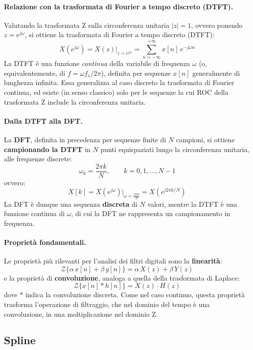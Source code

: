 \paragraph{Relazione con la trasformata di Fourier a tempo discreto (DTFT).}
Valutando la trasformata Z sulla circonferenza unitaria $|z| = 1$, ovvero ponendo $z = e^{j\omega}$, si ottiene la trasformata di Fourier a tempo discreto (DTFT):
\[
X\!\left(e^{j\omega}\right) = X(z)\big|_{z=e^{j\omega}}
= \sum_{n=-\infty}^{+\infty} x[n]\, e^{-j\omega n}
\]
La DTFT è una funzione \textit{continua} della variabile di frequenza $\omega$ (o, equivalentemente, di $f = \omega f_s / 2\pi$), definita per sequenze $x[n]$ generalmente di lunghezza infinita. Essa generalizza al caso discreto la trasformata di Fourier continua, ed esiste (in senso classico) solo per le sequenze la cui ROC della trasformata Z include la circonferenza unitaria.

\paragraph{Dalla DTFT alla DFT.}
La \textbf{DFT}, definita in precedenza per sequenze finite di $N$ campioni, si ottiene \textbf{campionando la DTFT} in $N$ punti equispaziati lungo la circonferenza unitaria, alle frequenze discrete:
\[
\omega_k = \frac{2\pi k}{N}, \qquad k = 0, 1, \ldots, N-1
\]
ovvero:
\[
X[k] = X\!\left(e^{j\omega}\right)\Big|_{\omega = \frac{2\pi k}{N}}
= X\!\left(e^{j2\pi k/N}\right)
\]
La DFT è dunque una sequenza \textbf{discreta} di $N$ valori, mentre la DTFT è una funzione continua di $\omega$, di cui la DFT ne rappresenta un campionamento in frequenza.

\paragraph{Proprietà fondamentali.}
Le proprietà più rilevanti per l'analisi dei filtri digitali sono la \textbf{linearità}:
\[
\mathcal{Z}\{\alpha\, x[n] + \beta\, y[n]\} =
\alpha\, X(z) + \beta\, Y(z)
\]
e la proprietà di \textbf{convoluzione}, analoga a quella della trasformata di Laplace:
\[
\mathcal{Z}\{x[n] * h[n]\} = X(z) \cdot H(z)
\]
dove $*$ indica la convoluzione discreta. Come nel caso continuo, questa proprietà trasforma l'operazione di filtraggio, che nel dominio del tempo è una convoluzione, in una moltiplicazione nel dominio Z.

\subsection{Spline}

